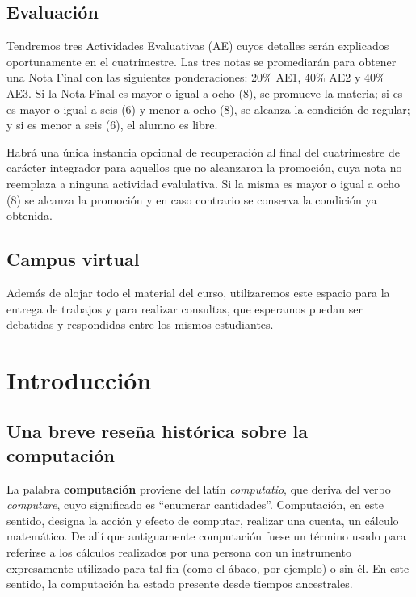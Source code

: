 \documentclass[]{book}
\begin{document}
\section*{Evaluación}\label{evaluacion}

Tendremos tres Actividades Evaluativas (AE) cuyos detalles serán
explicados oportunamente en el cuatrimestre. Las tres notas se
promediarán para obtener una Nota Final con las siguientes
ponderaciones: 20\% AE1, 40\% AE2 y 40\% AE3. Si la Nota Final es mayor
o igual a ocho (8), se promueve la materia; si es es mayor o igual a
seis (6) y menor a ocho (8), se alcanza la condición de regular; y si es
menor a seis (6), el alumno es libre.

Habrá una única instancia opcional de recuperación al final del
cuatrimestre de carácter integrador para aquellos que no alcanzaron la
promoción, cuya nota no reemplaza a ninguna actividad evalulativa. Si la
misma es mayor o igual a ocho (8) se alcanza la promoción y en caso
contrario se conserva la condición ya obtenida.

\section*{Campus virtual}\label{campus-virtual}

Además de alojar todo el material del curso, utilizaremos este espacio
para la entrega de trabajos y para realizar consultas, que esperamos
puedan ser debatidas y respondidas entre los mismos estudiantes.

\chapter{Introducción}\label{introduccion}

\section{Una breve reseña histórica sobre la
computación}\label{una-breve-resena-historica-sobre-la-computacion}

La palabra \textbf{computación} proviene del latín \emph{computatio},
que deriva del verbo \emph{computare}, cuyo significado es ``enumerar
cantidades''. Computación, en este sentido, designa la acción y efecto
de computar, realizar una cuenta, un cálculo matemático. De allí que
antiguamente computación fuese un término usado para referirse a los
cálculos realizados por una persona con un instrumento expresamente
utilizado para tal fin (como el ábaco, por ejemplo) o sin él. En este
sentido, la computación ha estado presente desde tiempos ancestrales.
\end{document}
